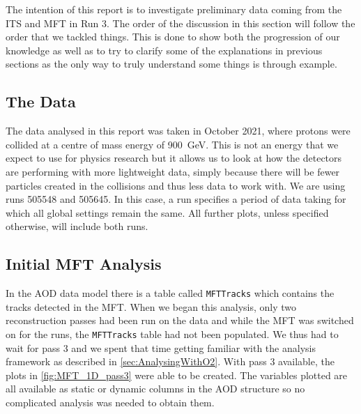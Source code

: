 The intention of this report is to investigate preliminary data coming from the ITS and MFT in Run 3. The order of the discussion in this section will follow the order that we tackled things. This is done to show both the progression of our knowledge as well as to try to clarify some of the explanations in previous sections as the only way to truly understand some things is through example. 

\subsection{The Data}
The data analysed in this report was taken in October 2021, where protons were collided at a centre of mass energy of \SI{900}{\giga\electronvolt}. This is not an energy that we expect to use for physics research but it allows us to look at how the detectors are performing with more lightweight data, simply because there will be fewer particles created in the collisions and thus less data to work with. We are using runs 505548 and 505645. In this case, a run specifies a period of data taking for which all global settings remain the same. All further plots, unless specified otherwise, will include both runs.


\subsection{Initial MFT Analysis}
In the AOD data model there is a table called \texttt{MFTTracks} which contains the tracks detected in the MFT. When we began this analysis, only two reconstruction passes had been run on the data and while the MFT was switched on for the runs, the \texttt{MFTTracks} table had not been populated. We thus had to wait for pass 3 and we spent that time getting familiar with the analysis framework as described in \cref{sec:AnalysingWithO2}. With pass 3 available, the plots in \cref{fig:MFT_1D_pass3} were able to be created. The variables plotted are all available as static or dynamic columns in the AOD structure so no complicated analysis was needed to obtain them. 


